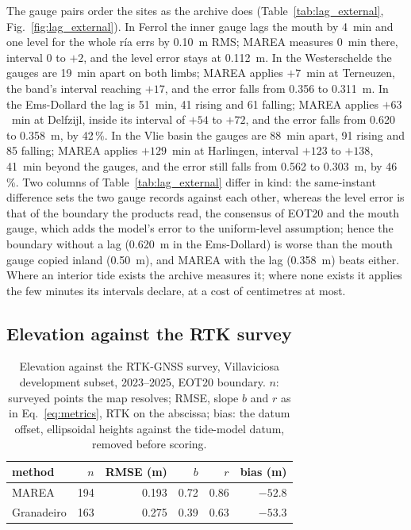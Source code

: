 The gauge pairs order the sites as the archive does
(Table~\ref{tab:lag_external}, Fig.~\ref{fig:lag_external}). In Ferrol
the inner gauge lags the mouth by 4~min and one level for the whole
r\'ia errs by 0.10~m RMS; MAREA measures 0~min there, interval 0 to
$+2$, and the level error stays at 0.112~m. In the Westerschelde the
gauges are 19~min apart on both limbs; MAREA applies $+7$~min at
Terneuzen, the band's interval reaching $+17$, and the error falls from
0.356 to 0.311~m. In the Ems-Dollard the lag is 51~min, 41 rising and 61
falling; MAREA applies $+63$~min at Delfzijl, inside its interval of
$+54$ to $+72$, and the error falls from 0.620 to 0.358~m, by 42\,\%. In
the Vlie basin the gauges are 88~min apart, 91 rising and 85 falling;
MAREA applies $+129$~min at Harlingen, interval $+123$ to $+138$, 41~min
beyond the gauges, and the error still falls from 0.562 to 0.303~m, by
46\,\%. Two columns of Table~\ref{tab:lag_external} differ in kind: the
same-instant difference sets the two gauge records against each other,
whereas the level error is that of the boundary the products read, the
consensus of EOT20 and the mouth gauge, which adds the model's error to
the uniform-level assumption; hence the boundary without a lag (0.620~m
in the Ems-Dollard) is worse than the mouth gauge copied inland
(0.50~m), and MAREA with the lag (0.358~m) beats either. Where an
interior tide exists the archive measures it; where none exists it
applies the few minutes its intervals declare, at a cost of centimetres
at most.

\subsection{Elevation against the RTK survey}\label{sec:res_rtk}

\begin{table}[t]
\centering
\caption{Elevation against the RTK-GNSS survey, Villaviciosa development
subset, 2023--2025, EOT20 boundary. $n$: surveyed points the map
resolves; RMSE, slope $b$ and $r$ as in Eq.~\eqref{eq:metrics}, RTK on
the abscissa; bias: the datum offset, ellipsoidal heights against the
tide-model datum, removed before scoring.
}
\label{tab:rtk}
\footnotesize
\begin{tabular}{@{}lrrrrr@{}}
\toprule
method & $n$ & RMSE (m) & $b$ & $r$ & bias (m) \\
\midrule
MAREA & 194 & 0.193 & 0.72 & 0.86 & $-52.8$ \\
Granadeiro & 163 & 0.275 & 0.39 & 0.63 & $-53.3$ \\
\bottomrule
\end{tabular}
\end{table}

